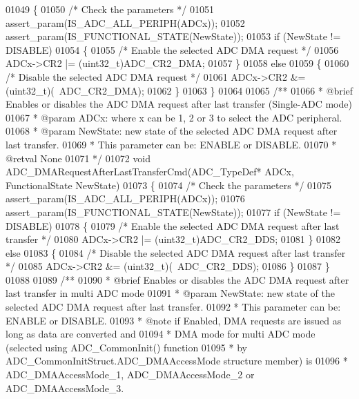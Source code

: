 \begin{DoxyCode}
01049 \{
01050   \textcolor{comment}{/* Check the parameters */}
01051   assert_param(IS\_ADC\_ALL\_PERIPH(ADCx));
01052   assert_param(IS\_FUNCTIONAL\_STATE(NewState));
01053   \textcolor{keywordflow}{if} (NewState != DISABLE)
01054   \{
01055     \textcolor{comment}{/* Enable the selected ADC DMA request */}
01056     ADCx->CR2 |= (uint32\_t)ADC_CR2_DMA;
01057   \}
01058   \textcolor{keywordflow}{else}
01059   \{
01060     \textcolor{comment}{/* Disable the selected ADC DMA request */}
01061     ADCx->CR2 &= (uint32\_t)(~ADC_CR2_DMA);
01062   \}
01063 \}
01064 
01065 \textcolor{comment}{/**}
01066 \textcolor{comment}{  * @brief  Enables or disables the ADC DMA request after last transfer (Single-ADC mode)  }
01067 \textcolor{comment}{  * @param  ADCx: where x can be 1, 2 or 3 to select the ADC peripheral.}
01068 \textcolor{comment}{  * @param  NewState: new state of the selected ADC DMA request after last transfer.}
01069 \textcolor{comment}{  *          This parameter can be: ENABLE or DISABLE.}
01070 \textcolor{comment}{  * @retval None}
01071 \textcolor{comment}{  */}
01072 \textcolor{keywordtype}{void} ADC_DMARequestAfterLastTransferCmd(ADC\_TypeDef* ADCx, FunctionalState NewState)
01073 \{
01074   \textcolor{comment}{/* Check the parameters */}
01075   assert_param(IS\_ADC\_ALL\_PERIPH(ADCx));
01076   assert_param(IS\_FUNCTIONAL\_STATE(NewState));
01077   \textcolor{keywordflow}{if} (NewState != DISABLE)
01078   \{
01079     \textcolor{comment}{/* Enable the selected ADC DMA request after last transfer */}
01080     ADCx->CR2 |= (uint32\_t)ADC_CR2_DDS;
01081   \}
01082   \textcolor{keywordflow}{else}
01083   \{
01084     \textcolor{comment}{/* Disable the selected ADC DMA request after last transfer */}
01085     ADCx->CR2 &= (uint32\_t)(~ADC_CR2_DDS);
01086   \}
01087 \}
01088 
01089 \textcolor{comment}{/**}
01090 \textcolor{comment}{  * @brief  Enables or disables the ADC DMA request after last transfer in multi ADC mode       }
01091 \textcolor{comment}{  * @param  NewState: new state of the selected ADC DMA request after last transfer.}
01092 \textcolor{comment}{  *          This parameter can be: ENABLE or DISABLE.}
01093 \textcolor{comment}{  * @note   if Enabled, DMA requests are issued as long as data are converted and }
01094 \textcolor{comment}{  *         DMA mode for multi ADC mode (selected using ADC\_CommonInit() function }
01095 \textcolor{comment}{  *         by ADC\_CommonInitStruct.ADC\_DMAAccessMode structure member) is }
01096 \textcolor{comment}{  *          ADC\_DMAAccessMode\_1, ADC\_DMAAccessMode\_2 or ADC\_DMAAccessMode\_3.     }

\end{DoxyCode}
